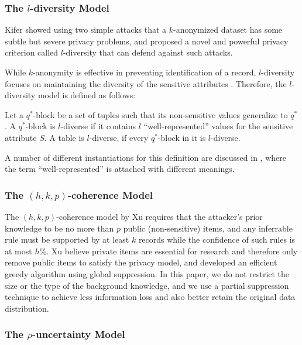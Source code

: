 \subsubsection{The $l$-diversity Model}
Kifer \etal \cite{Kifer:l-diversity} showed using two simple attacks that a
$k$-anonymized dataset has some subtle but severe privacy problems, and
proposed a novel and powerful privacy criterion called $l$-diversity that
can defend against such attacks.

While $k$-anonymity is effective in preventing identification of a record,
$l$-diversity focuses on maintaining the diversity of the sensitive attributes \cite{aggarwal2008general}.
Therefore, the $l$-diversity model is defined as follows:

\begin{Definition}
  Let a $q^*$-block be a set of tuples such that its non-sensitive values
  generalize to $q^*$.  A $q^*$-block is $l$-diverse if it contains $l$
  ``well-represented'' values for the sensitive attribute $S$.  A table
  is $l$-diverse, if every $q^*$-block in it is $l$-diverse.
\end{Definition}

A number of different instantiations for this definition are discussed
in \cite{Kifer:l-diversity}, where the term
``well-represented'' is attached with different meanings.

\subsubsection{The $(h,k,p)$-coherence Model}
The $(h,k,p)$-coherence model by Xu \etal \cite{Xu:2008:ATD}
requires that the attacker's prior knowledge to be no more than $p$ public
(non-sensitive) items, and any inferrable rule must be supported by at least
$k$ records while the confidence of such rules is at most $h$\%. Xu believe
private items are essential for research and therefore only remove public
items to satisfy the privacy model, and developed an efficient greedy
algorithm using global suppression. In this paper, we do not restrict the
size or the type of the background knowledge, and we use a partial
suppression technique to achieve less information loss and also better retain
the original data distribution.

\subsubsection{The $\rho$-uncertainty Model}

